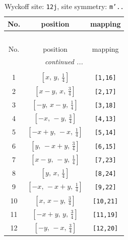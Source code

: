 \documentclass[fleqn,8pt]{jsarticle}
\begin{document}
\begin{longtable}{ccc}
\caption{Wyckoff site: {\tt 12j}, site symmetry: {\tt m'..}}
 \\
 \hline \hline
No. & position & mapping \\ \hline \endfirsthead

\multicolumn{2}{l}{\tablename\ \thetable{}} \\
 \hline \hline
No. & position & mapping \\ \hline \endhead

 \hline \hline
\multicolumn{2}{r}{\footnotesize\it continued ...} \\ \endfoot

 \hline \hline
\multicolumn{2}{r}{} \\ \endlastfoot

1 & $\left[ x,\, y,\, \frac{1}{4} \right]$ & {\tt [1,16]} \\ \hline
2 & $\left[ x - y,\, x,\, \frac{3}{4} \right]$ & {\tt [2,17]} \\ \hline
3 & $\left[ - y,\, x - y,\, \frac{1}{4} \right]$ & {\tt [3,18]} \\ \hline
4 & $\left[ - x,\, - y,\, \frac{3}{4} \right]$ & {\tt [4,13]} \\ \hline
5 & $\left[ - x + y,\, - x,\, \frac{1}{4} \right]$ & {\tt [5,14]} \\ \hline
6 & $\left[ y,\, - x + y,\, \frac{3}{4} \right]$ & {\tt [6,15]} \\ \hline
7 & $\left[ x - y,\, - y,\, \frac{1}{4} \right]$ & {\tt [7,23]} \\ \hline
8 & $\left[ y,\, x,\, \frac{1}{4} \right]$ & {\tt [8,24]} \\ \hline
9 & $\left[ - x,\, - x + y,\, \frac{1}{4} \right]$ & {\tt [9,22]} \\ \hline
10 & $\left[ x,\, x - y,\, \frac{3}{4} \right]$ & {\tt [10,21]} \\ \hline
11 & $\left[ - x + y,\, y,\, \frac{3}{4} \right]$ & {\tt [11,19]} \\ \hline
12 & $\left[ - y,\, - x,\, \frac{3}{4} \right]$ & {\tt [12,20]} \\
\end{longtable}
\renewcommand{\arraystretch}{1.2}
\end{document}
